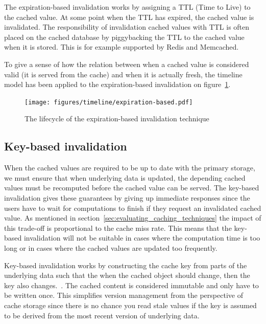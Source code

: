 The expiration-based invalidation works by assigning a TTL (Time to Live) to the cached value. At some point when the TTL has expired, the cached value is invalidated. The responsibility of invalidation cached values with TTL is often placed on the cached database by piggybacking the TTL to the cached value when it is stored. This is for example supported by Redis and Memcached.

To give a sense of how the relation between when a cached value is considered valid (it is served from the cache) and when it is actually fresh, the timeline model has been applied to the expiration-based invalidation on figure~\ref{fig:timeline:expiration-based}.

\begin{figure}[ht!]
  \centering
  \texttt{[image: figures/timeline/expiration-based.pdf]}
  \caption{The lifecycle of the expiration-based invalidation technique}
  \label{fig:timeline:expiration-based}
\end{figure}


\subsection{Key-based invalidation}
\label{subsec:key_based_invalidation}

When the cached values are required to be up to date with the primary storage, we must ensure that when underlying data is updated, the depending cached values must be recomputed before the cached value can be served. The key-based invalidation gives these guarantees by giving up immediate responses since the users have to wait for computations to finish if they request an invalidated cached value. As mentioned in section~\ref{sec:evaluating_caching_techniques} the impact of this trade-off is proportional to the cache miss rate. This means that the key-based invalidation will not be suitable in cases where the computation time is too long or in cases where the cached values are updated too frequently.

Key-based invalidation works by constructing the cache key from parts of the underlying data such that the when the cached object should change, then the key also changes.~\cite{blog:key-based-invalidation}. The cached content is considered immutable and only have to be written once. This simplifies version management from the perspective of cache storage since there is no chance you read stale values if the key is assumed to be derived from the most recent version of underlying data.

